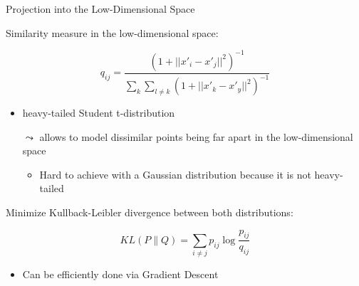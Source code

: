 \documentclass[aspectratio=169]{../latex_main/tntbeamer}  %
\begin{document}
	
	\begin{frame}[c]{Projection into the Low-Dimensional Space}
	    
	    Similarity measure in the low-dimensional space:
	    
	    $$q_{ij} = \frac{ (1 + ||x'_i - x'_j ||^2) ^{-1}}{\sum_k \sum_{l\neq k} (1+ ||x'_k - x'_y||^2)^{-1}} $$
	    
	    \begin{itemize}
	        \item heavy-tailed Student t-distribution
	        \item[$\leadsto$] allows to model dissimilar points being far apart in the low-dimensional space
	        \begin{itemize}
	            \item Hard to achieve with a Gaussian distribution because it is not heavy-tailed
	        \end{itemize}
	    \end{itemize}
	    
	    \pause
	    
	    Minimize Kullback-Leibler divergence between both distributions:
	    
	    $$KL(P \parallel  Q) = \sum_{i \neq j} p_{ij} \log \frac{p_{ij}}{q_{ij}}$$
	    
	    \begin{itemize}
	        \item Can be efficiently done via Gradient Descent
	    \end{itemize}
	    
	\end{frame}
	
\end{document}
